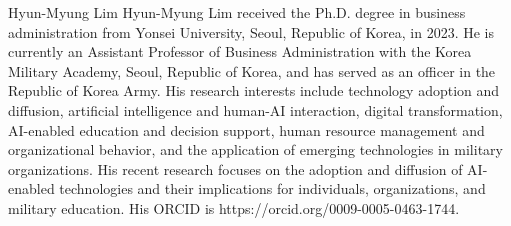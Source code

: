 \documentclass{ieeeaccess}
\begin{document}
\begin{IEEEbiographynophoto}{Hyun-Myung Lim}
Hyun-Myung Lim received the Ph.D. degree in business administration from Yonsei University, Seoul, Republic of Korea, in 2023. He is currently an Assistant Professor of Business Administration with the Korea Military Academy, Seoul, Republic of Korea, and has served as an officer in the Republic of Korea Army. His research interests include technology adoption and diffusion, artificial intelligence and human-AI interaction, digital transformation, AI-enabled education and decision support, human resource management and organizational behavior, and the application of emerging technologies in military organizations. His recent research focuses on the adoption and diffusion of AI-enabled technologies and their implications for individuals, organizations, and military education. His ORCID is https://orcid.org/0009-0005-0463-1744.
\end{IEEEbiographynophoto}

\EOD
\end{document}
